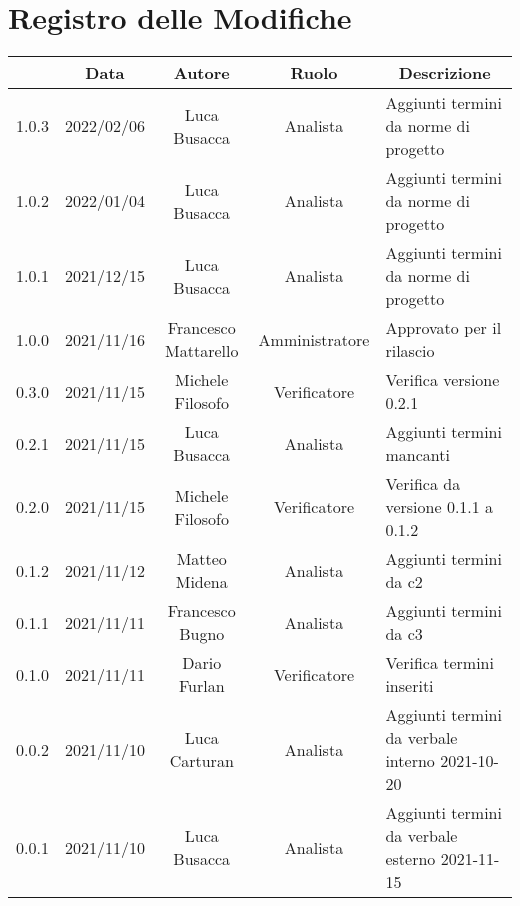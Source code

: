 \thispagestyle{empty}
\section*{Registro delle Modifiche}

\begin{center}
	\renewcommand{\arraystretch}{1.8}
	\begin{longtable}[c]{c | c | c | c | p{5cm}}
		\rowcolor[HTML]{125E28}
		\multicolumn{1}{c}{\color[HTML]{FFFFFF} \textbf{Versione}} & 
		\multicolumn{1}{c}{\color[HTML]{FFFFFF} \textbf{Data}} & 
		\multicolumn{1}{c}{\color[HTML]{FFFFFF} \textbf{Autore}} & 
		\multicolumn{1}{c}{\color[HTML]{FFFFFF} \textbf{Ruolo}} & 
		\multicolumn{1}{c}{\color[HTML]{FFFFFF} \textbf{Descrizione}} \\
		\endhead
		1.0.3 & 2022/02/06 & Luca Busacca & Analista & Aggiunti termini da norme di progetto\\
		1.0.2 & 2022/01/04 & Luca Busacca & Analista & Aggiunti termini da norme di progetto\\
		1.0.1 & 2021/12/15 & Luca Busacca & Analista & Aggiunti termini da norme di progetto\\
		1.0.0 & 2021/11/16 & Francesco Mattarello & Amministratore & Approvato per il rilascio\\
		0.3.0 & 2021/11/15 & Michele Filosofo & Verificatore & Verifica versione 0.2.1\\
		0.2.1 & 2021/11/15 & Luca Busacca & Analista & Aggiunti termini mancanti\\
		0.2.0 & 2021/11/15 & Michele Filosofo & Verificatore & Verifica da versione 0.1.1 a 0.1.2\\
		0.1.2 & 2021/11/12 & Matteo Midena & Analista & Aggiunti termini da c2\\
		0.1.1 & 2021/11/11 & Francesco Bugno & Analista & Aggiunti termini da c3\\
		0.1.0 & 2021/11/11 & Dario Furlan & Verificatore & Verifica termini inseriti\\
		0.0.2 & 2021/11/10 & Luca Carturan & Analista & Aggiunti termini da verbale interno 2021-10-20\\
		0.0.1 & 2021/11/10 & Luca Busacca & Analista & Aggiunti termini da verbale esterno 2021-11-15\\

	\end{longtable}
\end{center}